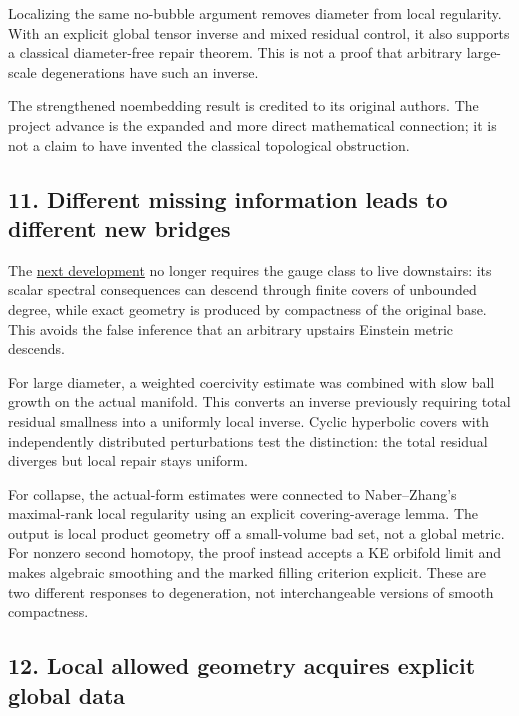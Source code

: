 \documentclass[
  10pt,
]{article}
\begin{document}
Localizing the same no-bubble argument removes diameter from local
regularity. With an explicit global tensor inverse and mixed residual
control, it also supports a classical diameter-free repair theorem. This
is not a proof that arbitrary large-scale degenerations have such an
inverse.

The strengthened noembedding result is credited to its original authors.
The project advance is the expanded and more direct mathematical
connection; it is not a claim to have invented the classical topological
obstruction.

\hypertarget{different-missing-information-leads-to-different-new-bridges}{%
\subsection{11. Different missing information leads to different new
bridges}\label{different-missing-information-leads-to-different-new-bridges}}

The \href{../continuation/20260924_frontier_bridges.md}{next
development} no longer requires the gauge class to live downstairs: its
scalar spectral consequences can descend through finite covers of
unbounded degree, while exact geometry is produced by compactness of the
original base. This avoids the false inference that an arbitrary
upstairs Einstein metric descends.

For large diameter, a weighted coercivity estimate was combined with
slow ball growth on the actual manifold. This converts an inverse
previously requiring total residual smallness into a uniformly local
inverse. Cyclic hyperbolic covers with independently distributed
perturbations test the distinction: the total residual diverges but
local repair stays uniform.

For collapse, the actual-form estimates were connected to Naber--Zhang's
maximal-rank local regularity using an explicit covering-average lemma.
The output is local product geometry off a small-volume bad set, not a
global metric. For nonzero second homotopy, the proof instead accepts a
KE orbifold limit and makes algebraic smoothing and the marked filling
criterion explicit. These are two different responses to degeneration,
not interchangeable versions of smooth compactness.

\hypertarget{local-allowed-geometry-acquires-explicit-global-data}{%
\subsection{12. Local allowed geometry acquires explicit global
data}\label{local-allowed-geometry-acquires-explicit-global-data}}
\end{document}
